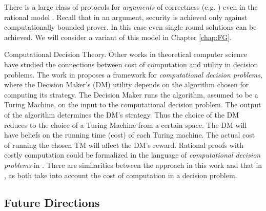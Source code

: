 \medskip
{}
There is a large class of protocols for {\em arguments} of correctness (e.g. \cite{ggp10,ggpr13,krr14}) even in the rational model \cite{ratargs,ratsumchecks}. Recall that in an argument, security is achieved only against computationally bounded prover. In this case even single round solutions can be achieved. We will consider a variant of this model in Chapter \ref{chap:FG}.

\medskip
\noindent
{\sc Computational Decision Theory.}
Other works in theoretical computer science have studied the connections between cost of computation and utility in decision problems.
The work in \cite{halpern2011don} proposes a framework for \emph{computational decision problems}, where the Decision Maker's (DM) utility depends on the algorithm chosen for computing its strategy.
The Decision Maker runs the algorithm, assumed to be a Turing Machine, on the input to the computational decision problem.
The output of the algorithm determines the DM's strategy. 
Thus the choice of the DM reduces to the choice of a Turing Machine from a certain space. The DM will have beliefs on the running time (cost) of each Turing machine. The actual cost of running the chosen TM will affect the DM's reward.
Rational proofs with costly computation could be formalized in the language of \emph{computational decision problems} in \cite{halpern2011don}. There are similarities between the approach in this
work and that in \cite{halpern2011don}, as both take into account the cost of computation in a decision problem.

\subsection{Future Directions}

